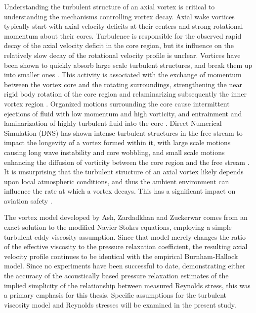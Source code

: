 Understanding the turbulent structure of an axial vortex is critical to 
understanding the mechanisms controlling vortex decay. Axial wake vortices 
typically 
start with axial velocity deficits at their centers and strong rotational 
momentum about their cores. Turbulence is responsible for the observed rapid 
decay of the axial velocity deficit in the core region, but its influence on 
the relatively slow decay of the rotational velocity profile is  unclear. 
Vortices have been shown to quickly absorb large 
scale turbulent structures, and break them up into smaller ones 
\cite{ragab1994,beninati2005}. This activity 
is associated with the exchange of momentum between the vortex core and the 
rotating surroundings, strengthening the near rigid body rotation of the core 
region and relaminarizing subsequently the inner vortex region 
\cite{bandyopadhyay1991}. Organized motions surrounding the core 
cause intermittent ejections of fluid with low momentum and high vorticity, and 
entrainment and laminarization of highly turbulent fluid into the core 
\cite{bandyopadhyay1991}. Direct Numerical Simulation (DNS) has shown 
intense turbulent structures in the free stream to impact the longevity of a 
vortex formed within it, with large scale motions causing long wave instability 
and core wobbling, and small scale motions enhancing the diffusion of vorticity 
between the core region and the free stream \cite{risso1997}. It is 
unsurprising that the turbulent structure of an axial vortex likely depends
upon local atmospheric conditions, and thus the ambient environment can 
influence the rate at which a vortex decays. This has a significant impact on 
aviation safety \cite{ash1998}.

The vortex model developed by Ash, Zardadkhan and Zuckerwar 
\cite{ash2011} comes from an exact solution to the modified
Navier Stokes equations, employing a simple turbulent eddy viscosity 
assumption. Since that model merely changes the ratio of the effective 
viscosity to the pressure relaxation coefficient, the resulting axial velocity 
profile continues to be identical with the empirical Burnham-Hallock model. 
Since no experiments have been successful to date, demonstrating either the 
accuracy of the acoustically based pressure relaxation estimates of the implied 
simplicity of the relationship between measured Reynolds stress, this was a 
primary emphasis for this thesis. Specific 
assumptions for the turbulent viscosity model and Reynolds stresses will be 
examined in the present study.
